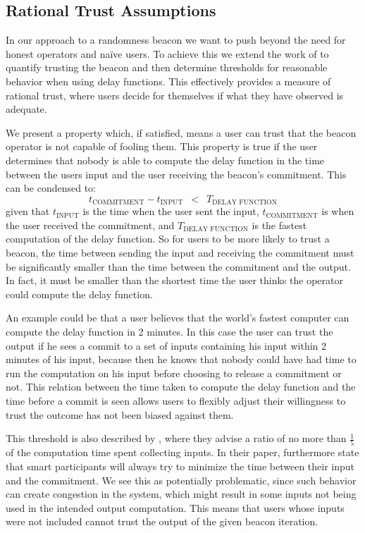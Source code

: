 \subsection{Rational Trust Assumptions}%
\label{sub:probabilistic_trust}
In our approach to a randomness beacon we want to push beyond the need for honest operators and naïve users.
To achieve this we extend the work of \citet{randomzoo} to quantify trusting the beacon and then determine thresholds for reasonable behavior when using delay functions.
This effectively provides a measure of rational trust, where users decide for themselves if what they have observed is adequate.

We present a property which, if satisfied, means a user can trust that the beacon operator is not capable of fooling them.
This property is true if the user determines that nobody is able to compute the delay function in the time between the users input and the user receiving the beacon's commitment.
This can be condensed to:
\begin{equation*}
    t_\text{COMMITMENT} - t_\text{INPUT}\enspace <\enspace T_\text{DELAY FUNCTION}
\end{equation*}
given that $t_\text{INPUT}$ is the time when the user sent the input, $t_\text{COMMITMENT}$ is when the user received the commitment, and $T_\text{DELAY FUNCTION}$ is the fastest computation of the delay function.
So for users to be more likely to trust a beacon, the time between sending the input and receiving the commitment must be significantly smaller than the time between the commitment and the output.
In fact, it must be smaller than the shortest time the user thinks the operator could compute the delay function.

An example could be that a user believes that the world's fastest computer can compute the delay function in 2 minutes.
In this case the user can trust the output if he sees a commit to a set of inputs containing his input within 2 minutes of his input, because then he knows that nobody could have had time to run the computation on his input before choosing to release a commitment or not.
This relation between the time taken to compute the delay function and the time before a commit is seen allows users to flexibly adjust their willingness to trust the outcome has not been biased against them.

This threshold is also described by \citet{randomzoo}, where they advise a ratio of no more than $\frac{1}{5}$ of the computation time spent collecting inputs.
In their paper, \citeauthor{randomzoo} furthermore state that smart participants will always try to minimize the time between their input and the commitment.
We see this as potentially problematic, since such behavior can create congestion in the system, which might result in some inputs not being used in the intended output computation.
This means that users whose inputs were not included cannot trust the output of the given beacon iteration.

